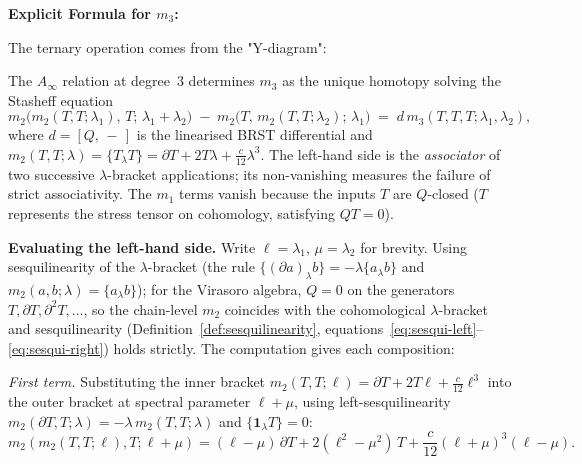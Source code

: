 \textbf{Explicit Formula for $m_3$:}

The ternary operation comes from the "Y-diagram":
\begin{center}
\end{center}

The $A_\infty$ relation at degree~$3$ determines $m_3$ as the unique
homotopy solving the Stasheff equation
\begin{equation}
m_2\bigl(m_2(T,T;\lambda_1),\, T;\, \lambda_1+\lambda_2\bigr)
\;-\; m_2\bigl(T,\, m_2(T,T;\lambda_2);\, \lambda_1\bigr)
\;=\; d\, m_3(T,T,T;\lambda_1,\lambda_2),
\end{equation}
where $d = [Q,\,-\,]$ is the linearised BRST differential and
$m_2(T,T;\lambda) = \{T_\lambda T\} = \partial T + 2T\lambda + \tfrac{c}{12}\lambda^3$.
The left-hand side is the \emph{associator} of two successive
$\lambda$-bracket applications; its non-vanishing measures the failure
of strict associativity. The $m_1$ terms vanish because the inputs
$T$ are $Q$-closed ($T$ represents the stress tensor on cohomology,
satisfying $QT = 0$).

\medskip
\noindent\textbf{Evaluating the left-hand side.}
Write $\ell = \lambda_1$, $\mu = \lambda_2$ for brevity.
Using sesquilinearity of the $\lambda$-bracket (the rule
$\{(\partial a)_\lambda b\} = -\lambda\{a_\lambda b\}$ and
$m_2(a,b;\lambda) = \{a_\lambda b\}$); for the Virasoro algebra, $Q = 0$ on the generators $T, \partial T, \partial^2 T, \ldots$, so the chain-level $m_2$ coincides with the cohomological $\lambda$-bracket and sesquilinearity (Definition~\ref{def:sesquilinearity},
equations~\eqref{eq:sesqui-left}--\eqref{eq:sesqui-right}) holds strictly. The computation gives each composition:

\smallskip
\emph{First term.} Substituting the inner bracket
$m_2(T,T;\ell) = \partial T + 2T\ell + \tfrac{c}{12}\ell^3$
into the outer bracket at spectral parameter $\ell + \mu$,
using left-sesquilinearity $m_2(\partial T, T;\lambda) = -\lambda\, m_2(T,T;\lambda)$
and $\{{\mathbf{1}}_\lambda T\} = 0$:
\begin{equation}
m_2(m_2(T,T;\ell),T;\ell+\mu)
= (\ell - \mu)\,\partial T
 + 2(\ell^2 - \mu^2)\,T
 + \frac{c}{12}(\ell+\mu)^3(\ell - \mu).
\end{equation}

